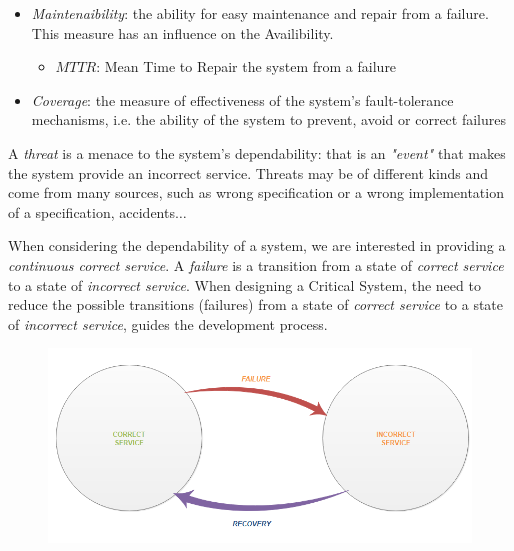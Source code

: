 \begin{itemize}
	\item \textsl{Maintenaibility}: the ability for easy maintenance and repair from a failure. This measure has an influence on the Availibility.
	\begin{itemize}
		\item[] $MTTR$: Mean Time to Repair the system from a failure
	\end{itemize}
\end{itemize}

\begin{itemize}
	\item \textsl{Coverage}: the measure of effectiveness of the system's fault-tolerance mechanisms, i.e. the ability of the system to prevent, avoid or correct failures
\end{itemize}

\newpage

A \textsl{threat} is a menace to the system's dependability: that is an \textsl{"event"} that makes the system provide an incorrect service. Threats may be of different kinds and come from many sources, such as wrong specification or a wrong implementation of a specification, accidents$\dots$

When considering the dependability of a system, we are interested in providing a \textsl{continuous correct service}. A \textsl{failure} is a transition from a state of \textsl{correct service} to a state of \textsl{incorrect service}.
When designing a Critical System, the need to reduce the possible transitions (failures) from a state of \textsl{correct service} to a state of \textsl{incorrect service}, guides the development process.

\begin{figure}[h!]
	\includegraphics[width=\textwidth]{img/correct-incorrect.png}
	\caption{}
\end{figure}

